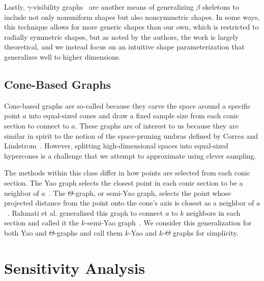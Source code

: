 Lastly, $\gamma$-visibility graphs~\cite{KatzTalBasri2007,KatzTal2015,KatzTal2017} are another means of generalizing $\beta$ skeletons to include not only nonuniform shapes but also nonsymmetric shapes.
%
In some ways, this technique allows for more generic shapes than our own, which is restricted to radially symmetric shapes, but as noted by the authors, the work is largely theoretical, and we instead focus on an intuitive shape parameterization that generalizes well to higher dimensions.

\subsection{Cone-Based Graphs}
\label{sec:bg_cones}

Cone-based graphs are so-called because they carve the space around a specific point $a$ into equal-sized cones and draw a fixed sample size from each conic section to connect to $a$.
%
These graphs are of interest to us because they are similar in spirit to the notion of the space-pruning umbras defined by Correa and Lindstrom~\cite{CorreaLindstrom2011}.
%
However, splitting high-dimensional spaces into equal-sized hypercones is a challenge that we attempt to approximate using clever sampling.

The methods within this class differ in how points are selected from each conic section.
%
The Yao graph selects the closest point in each conic section to be a neighbor of $a$~\cite{Yao1982}.
%
The $\Theta$-graph, or semi-Yao graph, selects the point whose projected distance from the point onto the cone's axis is closest as a neighbor of $a$~\cite{Clarkson1987,Keil1988}.
%
Rahmati et al. generalized this graph to connect $a$ to $k$ neighbors in each section and called it the $k$-semi-Yao graph~\cite{RahmatiKingWhitesides2013}.
%
We consider this generalization for both Yao and $\Theta$-graphs and call them $k$-Yao and $k$-$\Theta$ graphs for simplicity.

\section{Sensitivity Analysis}
\label{sec:sensitivity}

